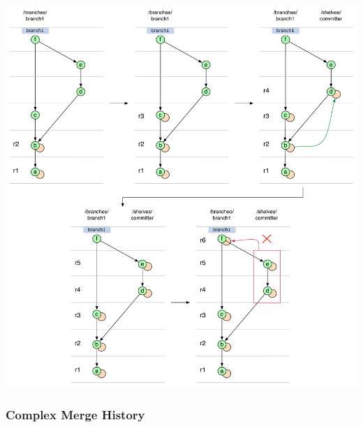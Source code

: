 \begin{center}
\includegraphics[width=\textwidth]{img/diagrams/boat_merge_git_to_svn.pdf}%
\label{boat_merge_git_to_svn}%
\end{center}

\subsubsection{Complex Merge History}

